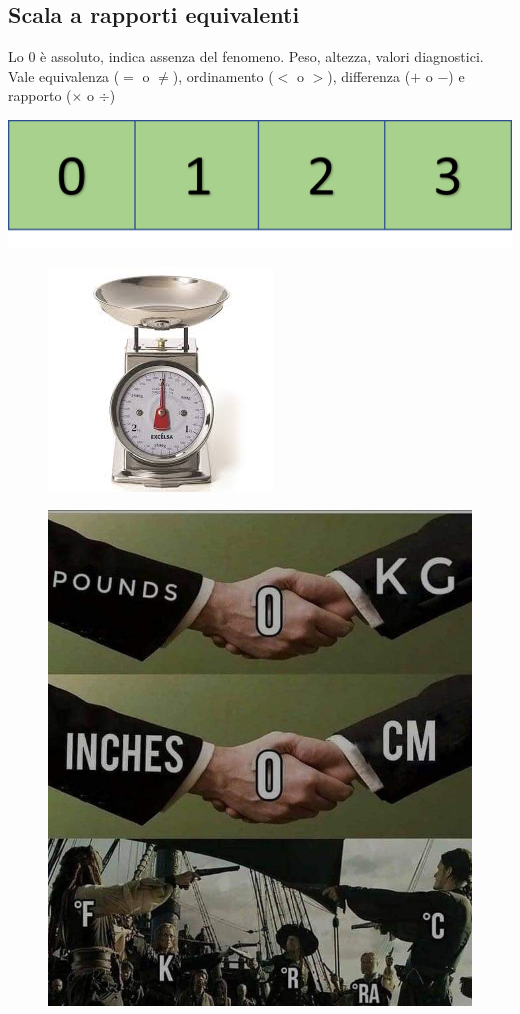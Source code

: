 \documentclass[compress]{beamer}
\begin{document}
\subsection{Scala a rapporti equivalenti}
\begin{frame}
	Lo 0 è assoluto, indica assenza del fenomeno. Peso, altezza, valori diagnostici. Vale equivalenza ($=$ o $\neq$),  ordinamento ($<$ o $>$), differenza ($+$ o $-$) e rapporto ($\times$ o $\div$)
	
	\begin{center}
		\includegraphics[width=0.40\linewidth]{rapporti.png}
	\end{center}
	
	
	\begin{figure}
		\centering
		\includegraphics[width=0.4\linewidth]{bilancia}
	\end{figure}
	
\end{frame}

\begin{frame}
	\begin{figure}
		\centering
		\includegraphics[width=0.5\linewidth]{scale1}
	\end{figure}
\end{frame}
\end{document}
